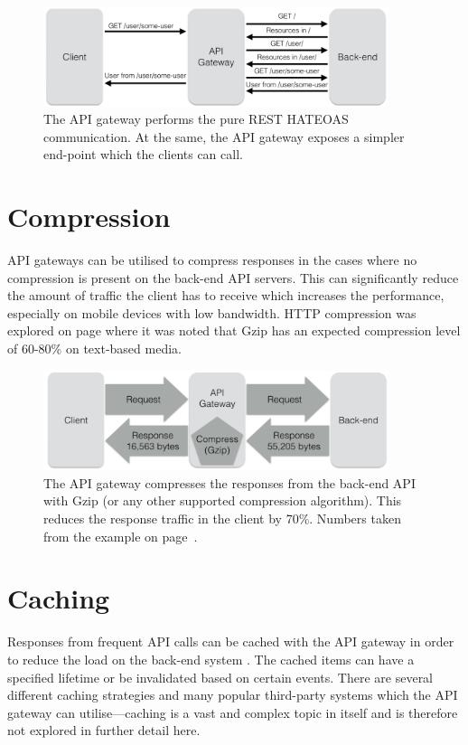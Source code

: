 \documentclass{cslthse-msc}
\begin{document}
\begin{figure}[H]
  \centering
    \begin{center}
      \includegraphics[width=0.9\textwidth]{images/api_gateway_hateoas.png}
    \end{center}
  \caption{The API gateway performs the pure REST HATEOAS communication. At the same, the API gateway exposes a simpler end-point which the clients can call.}
\end{figure}

\section{Compression}
\label{compression}
API gateways can be utilised to compress responses in the cases where no compression is present on the back-end API servers. This can significantly reduce the amount of traffic the client has to receive which increases the performance, especially on mobile devices with low bandwidth. HTTP compression was explored on page \pageref{compression} where it was noted that Gzip has an expected compression level of 60-80\% on text-based media.

\begin{figure}[H]
  \centering
    \begin{center}
      \includegraphics[width=0.9\textwidth]{images/api_gateway_compression.png}
    \end{center}
  \caption{The API gateway compresses the responses from the back-end API with Gzip (or any other supported compression algorithm). This reduces the response traffic in the client by 70\%. Numbers taken from the example on page~\pageref{compression}.}
\end{figure}

\section{Caching}
\label{caching}
Responses from frequent API calls can be cached with the API gateway in order to reduce the load on the back-end system \cite[page 107]{AASG}. The cached items can have a specified lifetime or be invalidated based on certain events. There are several different caching strategies and many popular third-party systems which the API gateway can utilise---caching is a vast and complex topic in itself and is therefore not explored in further detail here.
\end{document}
